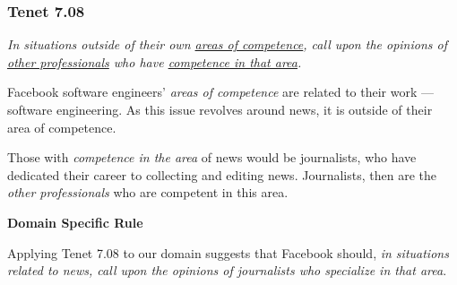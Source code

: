 \subsubsection{Tenet 7.08}

\emph{In situations outside of their own \ul{areas of competence}, call upon the opinions of \ul{other professionals} who have \ul{competence in that area}. \cite{se_code}}

Facebook software engineers' \emph{areas of competence} are related to their work --- software engineering. As this issue revolves around news, it is outside of their area of competence.

Those with \emph{competence in the area} of news would be journalists, who have dedicated their career to collecting and editing news. \cite{dictionary} Journalists, then are the \emph{other professionals} who are competent in this area.

%
%
\noindent \textbf{Domain Specific Rule}

Applying Tenet 7.08 to our domain suggests that Facebook should, \emph{in situations related to news, call upon the opinions of journalists who specialize in that area}. 
